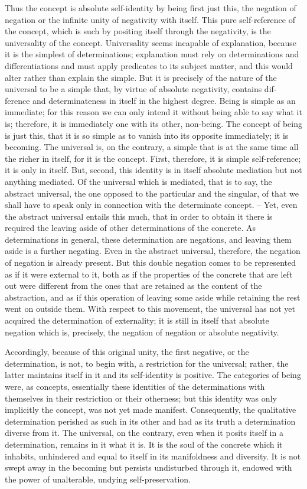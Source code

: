 Thus the concept is absolute self-identity
by being first just this, the negation of negation
or the infinite unity of negativity with itself.
This pure self-reference of the concept,
which is such by positing itself through the negativity,
is the universality of the concept.
Universality seems incapable of explanation,
because it is the simplest of determinations;
explanation must rely on determinations and differentiations
and must apply predicates to its subject matter,
and this would alter rather than explain the simple.
But it is precisely of the nature of the
universal to be a simple that, by virtue of absolute negativity, contains dif-
ference and determinateness in itself in the highest degree. Being is simple
as an immediate; for this reason we can only intend it without being able
to say what it is; therefore, it is immediately one with its other, non-being.
The concept of being is just this, that it is so simple as to vanish into its
opposite immediately; it is becoming. The universal is, on the contrary, a
simple that is at the same time all the richer in itself, for it is the concept.
First, therefore, it is simple self-reference; it is only in itself. But, second,
this identity is in itself absolute mediation but not anything mediated. Of
the universal which is mediated, that is to say, the abstract universal, the one
opposed to the particular and the singular, of that we shall have to speak
only in connection with the determinate concept. – Yet, even the abstract
universal entails this much, that in order to obtain it there is required the
leaving aside of other determinations of the concrete. As determinations in
general, these determination are negations, and leaving them aside is a further
negating. Even in the abstract universal, therefore, the negation of negation
is already present. But this double negation comes to be represented as if
it were external to it, both as if the properties of the concrete that are left
out were different from the ones that are retained as the content of the
abstraction, and as if this operation of leaving some aside while retaining
the rest went on outside them. With respect to this movement, the universal
has not yet acquired the determination of externality; it is still in itself that
absolute negation which is, precisely, the negation of negation or absolute
negativity.

Accordingly, because of this original unity, the first negative, or the
determination, is not, to begin with, a restriction for the universal; rather,
the latter maintains itself in it and its self-identity is positive. The categories
of being were, as concepts, essentially these identities of the determinations
with themselves in their restriction or their otherness; but this identity was
only implicitly the concept, was not yet made manifest. Consequently, the
qualitative determination perished as such in its other and had as its truth
a determination diverse from it. The universal, on the contrary, even when
it posits itself in a determination, remains in it what it is. It is the soul
of the concrete which it inhabits, unhindered and equal to itself in its
manifoldness and diversity. It is not swept away in the becoming but persists
undisturbed through it, endowed with the power of unalterable, undying
self-preservation.

